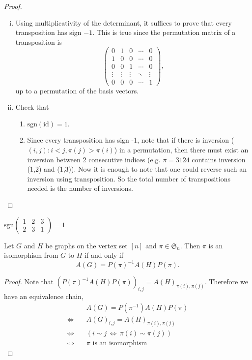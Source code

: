 \begin{proof}
\begin{enumerate}[(i)]
\item Using multiplicativity of the determinant, it suffices to prove that every transposition has sign $-1$. This is true since the permutation matrix of a transposition is
\[
\begin{pmatrix}
0&1&0&\cdots&0\\
1&0&0&\cdots&0\\
0&0&1&\cdots&0\\
\vdots &\vdots&\vdots&\ddots&\vdots\\
0&0&0&\cdots&1
\end{pmatrix}
,\]
up to a permutation of the basis vectors.
\item Check that 
\begin{enumerate}
\item $\mathrm{sgn}(\mathrm{id})=1$.
\item Since every transposition has sign -1, note that if there is inversion ($(i,j): i < j, \pi(j) > \pi(i)$) in a permutation, then there must exist an inversion between 2 consecutive indices (e.g. $\pi = 3124$ contains inversion (1,2) and (1,3)). Now it is enough to note that one could reverse such an inversion using transposition. So the total number of transpositions needed is the number of inversions.
\end{enumerate}
\end{enumerate}
\end{proof}

\begin{example}
$\mathrm{sgn}\begin{pmatrix}
1&2&3\\
2&3&1
\end{pmatrix}=1$
\end{example}

\begin{proposition}
Let $G$ and $H$ be graphs on the vertex set $[n]$ and $\pi\in\mathfrak{S}_n$. Then $\pi$ is an isomorphism from $G$ to $H$ if and only if 
 \[A(G)=P(\pi)^{-1}A(H)P(\pi).\]
\end{proposition}
\begin{proof}
Note that $(P(\pi)^{-1}A(H)P(\pi))_{i,j}=A(H)_{\pi(i),\pi(j)}.$ Therefore we have an equivalence chain,
\begin{align*}
&A(G)=P(\pi^{-1})A(H)P(\pi)\\
\Longleftrightarrow\quad & A(G)_{i,j}=A(H)_{\pi(i),\pi(j)}\\
\Longleftrightarrow\quad & (i\sim j\,\Longleftrightarrow\,\pi(i)\sim\pi(j))\\
\Longleftrightarrow\quad &\pi \textrm{ is an isomorphism}
\end{align*}
\end{proof}

